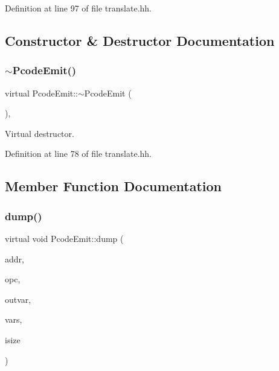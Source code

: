 Definition at line 97 of file translate.\+hh.



\subsection{Constructor \& Destructor Documentation}
\mbox{\label{class_pcode_emit_aea571c3fae3b7c2e50947e69352437d1}} 
\subsubsection{\texorpdfstring{$\sim$PcodeEmit()}{~PcodeEmit()}}
{\footnotesize\ttfamily virtual Pcode\+Emit\+::$\sim$\+Pcode\+Emit (\begin{DoxyParamCaption}\item[{void}]{ }\end{DoxyParamCaption})\hspace{0.3cm}{\ttfamily [inline]}, {\ttfamily [virtual]}}



Virtual destructor. 



Definition at line 78 of file translate.\+hh.



\subsection{Member Function Documentation}
\mbox{\label{class_pcode_emit_a00f25999bbdea677b82577b21bdfff8e}} 
\subsubsection{\texorpdfstring{dump()}{dump()}}
{\footnotesize\ttfamily virtual void Pcode\+Emit\+::dump (\begin{DoxyParamCaption}\item[{const \mbox{\hyperlink{class_address}{Address}} \&}]{addr,  }\item[{\mbox{\hyperlink{opcodes_8hh_abeb7dfb0e9e2b3114e240a405d046ea7}{Op\+Code}}}]{opc,  }\item[{\mbox{\hyperlink{struct_varnode_data}{Varnode\+Data}} $\ast$}]{outvar,  }\item[{\mbox{\hyperlink{struct_varnode_data}{Varnode\+Data}} $\ast$}]{vars,  }\item[{int4}]{isize }\end{DoxyParamCaption})\hspace{0.3cm}{\ttfamily [pure virtual]}}



